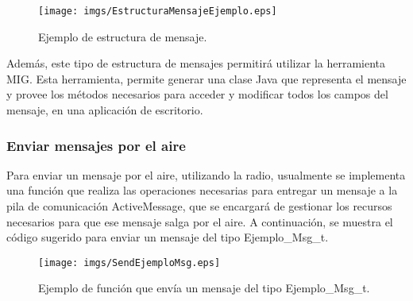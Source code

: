 \begin{center}
\begin{figure}[H]
\centering
\texttt{[image: imgs/EstructuraMensajeEjemplo.eps]} 
\caption{Ejemplo de estructura de mensaje.}
\end{figure}
\end{center}
 
Además, este tipo de estructura de mensajes permitirá utilizar la herramienta MIG. Esta herramienta, permite generar una clase Java que representa el mensaje y provee los métodos necesarios para acceder y modificar todos los campos del mensaje, en una aplicación de escritorio. 

\subsubsection{Enviar mensajes por el aire}
Para enviar un mensaje por el aire, utilizando la radio, usualmente se implementa una función que realiza las operaciones necesarias para entregar un mensaje a la pila de comunicación ActiveMessage, que se encargará de gestionar los recursos necesarios para que ese mensaje salga por el aire. A continuación, se muestra el código sugerido para enviar un mensaje del tipo Ejemplo\_Msg\_t.

\begin{center}
\begin{figure}[H]
\centering
\texttt{[image: imgs/SendEjemploMsg.eps]} 
\caption{Ejemplo de función que envía un mensaje del tipo Ejemplo\_Msg\_t.}
\end{figure}
\end{center}

